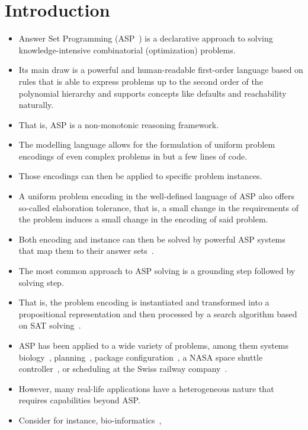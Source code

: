 \chapter{Introduction}\label{sec:introduction}
\begin{itemize}
  \item
   Answer Set Programming (ASP~\cites{baral02a,lifschitz08b,gekakasc12a}) is a declarative approach to solving knowledge-intensive combinatorial (optimization) problems.
  \item 
   Its main draw is a powerful and human-readable first-order language based on rules
   that is able to express problems up to the second order of the polynomial hierarchy
   and supports concepts like defaults and reachability naturally.
  \item
   That is, ASP is a non-monotonic reasoning framework.
  \item
   The modelling language allows for the formulation of uniform problem encodings of even complex problems in but a few lines of code.
  \item 
   Those encodings can then be applied to specific problem instances.
  \item 
   A uniform problem encoding in the well-defined language of ASP also offers so-called elaboration tolerance,
   that is, a small change in the requirements of the problem induces a small change in the encoding of said problem.
  \item
   Both encoding and instance can then be solved by powerful ASP systems that map them to their answer sets~\cite{gellif88b}.
  \item
   The most common approach to ASP solving is a grounding step followed by solving step.
  \item 
   That is, the problem encoding is instantiated and transformed into a propositional representation
   and then processed by a search algorithm based on SAT solving~\cite{baseseti09a}.
  \item
   ASP has been applied to a wide variety of problems, among them 
   systems biology~\cite{kascsivi13a},
   planning~\cite{gekaknsc11a},
   package configuration~\cite{gekasc11c},
   a NASA space shuttle controller~\cite{nobagewaba01a}, or
   scheduling at the Swiss railway company~\cite{abjoossctowa21a}.
  \item
   However, many real-life applications have a heterogeneous nature that requires capabilities beyond ASP.
  \item
   Consider for instance,
   bio-informatics~\cite{frscscsiwa18a},

\end{itemize}
